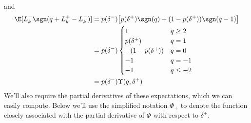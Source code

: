 \documentclass[12pt]{article}
\begin{document}
and
\begin{align}
\E [ L_k^- \sgn(q + L_k^+ - L_k^-)] & = p(\delta^-) \bigl[ p(\delta^+) \sgn(q) + (1-p(\delta^+)) \sgn(q-1) \bigr] \nonumber \\
& = p(\delta^-) \begin{cases} 
1 & q \geq 2 \\
p(\delta^+) & q = 1 \\
-(1 - p(\delta^+)) & q = 0 \\
-1 & q = -1 \\
-1 & q \leq -2
\end{cases} \\
& = p(\delta^-) \Upsilon(q, \delta^+)
\end{align}
We'll also require the partial derivatives of these expectations, which we can easily compute. Below we'll use the simplified notation $\Phi_+$ to denote the function closely associated with the partial derivative of $ \Phi$ with respect to $\delta^+$.
\end{document}

